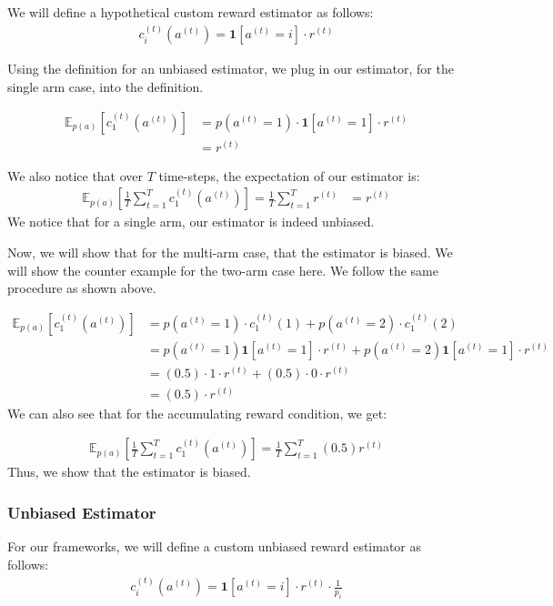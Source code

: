 \documentclass[11pt]{article}
\begin{document}
We will define a hypothetical custom reward estimator as follows:
\begin{align}
  c_{i}^{(t)}\left(a^{(t)}\right)=\mathbf{1}\left[a^{(t)}=i\right] \cdot r^{(t)}
\end{align}

Using the definition for an unbiased estimator, we plug in our estimator, for the single arm case, into the definition.

\begin{align}
\mathbb{E}_{p(a)}\left[c_{1}^{(t)}\left(a^{(t)}\right)\right] &=p\left(a^{(t)}=1\right) \cdot \mathbf{1}\left[a^{(t)}=1\right] \cdot r^{(t)} \\
&=r^{(t)}
\end{align}

We also notice that over $T$ time-steps, the expectation of our estimator is:
\begin{align}
\mathbb{E}_{p(a)}\left[\frac{1}{T} \sum_{t=1}^{T} c_{1}^{(t)}\left(a^{(t)}\right)\right]=\frac{1}{T} \sum_{t=1}^{T} r^{(t)}
&=r^{(t)}
\end{align}
We notice that for a single arm, our estimator is indeed unbiased.

Now, we will show that for the multi-arm case, that the estimator is biased. We will show the counter example for the two-arm case here. We follow the same procedure as shown above.

\begin{align}
 \mathbb{E}_{p(a)}\left[c_{1}^{(t)}\left(a^{(t)}\right)\right] &=p\left(a^{(t)}=1\right) \cdot c_{1}^{(t)}(1)+p\left(a^{(t)}=2\right) \cdot c_{1}^{(t)}(2) \\ &=p\left(a^{(t)}=1\right) \mathbf{1}\left[a^{(t)}=1\right] \cdot r^{(t)}+p\left(a^{(t)}=2\right) \mathbf{1}\left[a^{(t)}=1\right] \cdot r^{(t)} \\ &=(0.5) \cdot 1 \cdot r^{(t)}+(0.5) \cdot 0 \cdot r^{(t)} \\
 &=(0.5) \cdot r^{(t)}
\end{align}
We can also see that for the accumulating reward condition, we get:

\begin{align}
    \mathbb{E}_{p(a)}\left[\frac{1}{T} \sum_{t=1}^{T} c_{1}^{(t)}\left(a^{(t)}\right)\right]=\frac{1}{T} \sum_{t=1}^{T}(0.5) r^{(t)}
\end{align}
Thus, we show that the estimator is biased.

\subsubsection{Unbiased Estimator}
For our frameworks, we will define a custom unbiased reward estimator as follows:
\begin{align}
  c_{i}^{(t)}\left(a^{(t)}\right)=\mathbf{1}\left[a^{(t)}=i\right] \cdot r^{(t)} \cdot \frac{1}{p_i}
\end{align}
\end{document}
